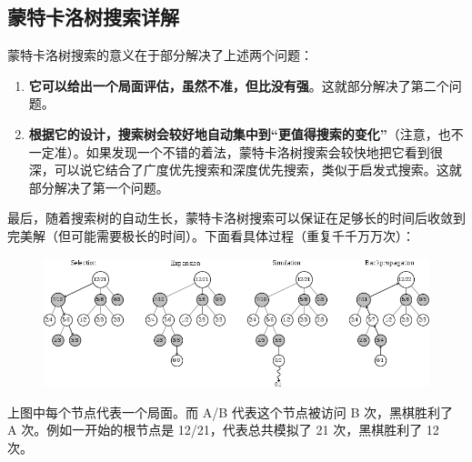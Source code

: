 \documentclass[12pt]{article}
\begin{document}
\subsection{蒙特卡洛树搜索详解}
蒙特卡洛树搜索的意义在于部分解决了上述两个问题：
\begin{enumerate}
\setlength{\itemsep}{0pt}
\setlength{\parsep}{0pt}
\setlength{\parskip}{0pt}
    \item \textbf{它可以给出一个局面评估，虽然不准，但比没有强}。这就部分解决了第二个问题。
    \item \textbf{根据它的设计，搜索树会较好地自动集中到“更值得搜索的变化”}（注意，也不一定准）。如果发现一个不错的着法，蒙特卡洛树搜索会较快地把它看到很深，可以说它结合了广度优先搜索和深度优先搜索，类似于启发式搜索。这就部分解决了第一个问题。
\end{enumerate}

最后，随着搜索树的自动生长，蒙特卡洛树搜索可以保证在足够长的时间后收敛到完美解（但可能需要极长的时间）。下面看具体过程（重复千千万万次）：
\begin{figure}[H]
    \centering
    \includegraphics[width=1\textwidth]{fig/MonteCarlo-Tree-Search-4-Steps.png}
\end{figure}

上图中每个节点代表一个局面。而 A/B 代表这个节点被访问 B 次，黑棋胜利了 A 次。例如一开始的根节点是 12/21，代表总共模拟了 21 次，黑棋胜利了 12 次。
\end{document}
